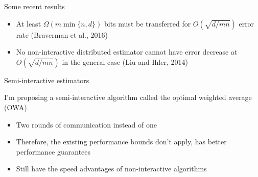 {\begin{frame}{Some recent results}
\begin{itemize}
\item
At least $\Omega(m\min\{n,d\})$ bits must be transferred for $O(\sqrt{d/mn})$ error rate
(Braverman et al., 2016)

\item
No non-interactive distributed estimator cannot have error decrease at $O(\sqrt{d/mn})$ in the general case
(Liu and Ihler, 2014)

\end{itemize}

\end{frame}


\begin{frame}{Semi-interactive estimators}

I'm proposing a semi-interactive algorithm called the optimal weighted average (OWA)
\begin{itemize}
\item
Two rounds of communication instead of one

\item
Therefore, the existing performance bounds don't apply, has better performance guarantees

\item
Still have the speed advantages of non-interactive algorithms

\end{itemize}
\end{frame}

}
